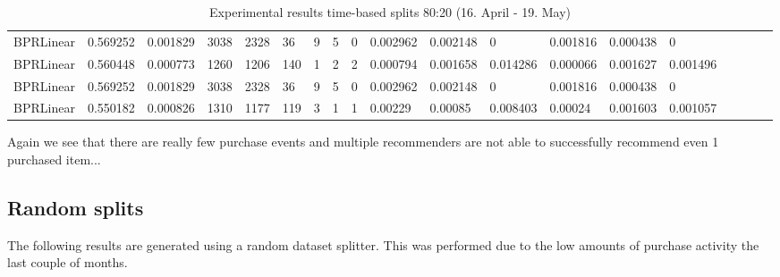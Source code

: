 \begin{table}[H]
{\begin{tabular}{*{19}l}
BPRLinear					&	0.569252 &	0.001829 &	3038 &	2328 &	36 &	9 &	5 &	0 &	0.002962 &	0.002148 &	0 &	0.001816 &	0.000438 &	0 &	 \\
BPRLinear					&	0.560448 &	0.000773 &	1260 &	1206 &	140 &	1 &	2 &	2 &	0.000794 &	0.001658 &	0.014286 &	0.000066 &	0.001627 &	0.001496 &	 \\
BPRLinear					&	0.569252 &	0.001829 &	3038 &	2328 &	36 &	9 &	5 &	0 &	0.002962 &	0.002148 &	0 &	0.001816 &	0.000438 &	0 &	 \\
BPRLinear					&	0.550182 &	0.000826 &	1310 &	1177 &	119 &	3 &	1 &	1 &	0.00229 &	0.00085 &	0.008403 &	0.00024 &	0.001603 &	0.001057 &	 \\

\bottomrule
\end{tabular}
}
\caption{Experimental results time-based splits 80:20 (16. April - 19. May)}
\end{table}

Again we see that there are really few purchase events and multiple recommenders are not able to successfully recommend even 1 purchased item...


\subsection{Random splits}

The following results are generated using a random dataset splitter. This was performed due to the low amounts of purchase activity the last couple of months.


